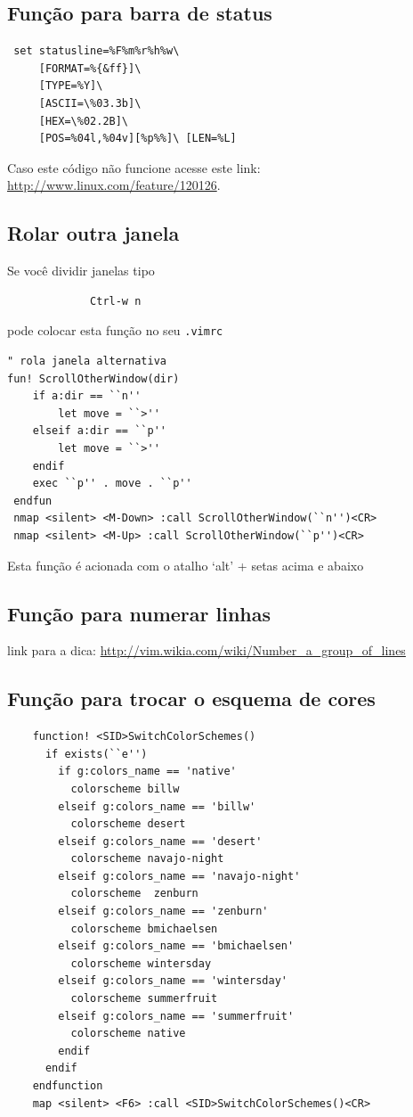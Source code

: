 \documentclass[10pt,a4paper,openany]{book}
\begin{document}
\subsection{Função para barra de status}\label{Função para barra de status}
\begin{verbatim}
 set statusline=%F%m%r%h%w\
	 [FORMAT=%{&ff}]\
	 [TYPE=%Y]\
	 [ASCII=\%03.3b]\
	 [HEX=\%02.2B]\
	 [POS=%04l,%04v][%p%%]\ [LEN=%L]
\end{verbatim}
Caso este código não funcione acesse este link: \url{http://www.linux.com/feature/120126}.


\subsection{Rolar outra janela}\label{Rolar outra janela}

Se você dividir janelas tipo

\begin{verbatim}
			 Ctrl-w n
\end{verbatim}

pode colocar esta função no seu \verb|.vimrc|

\begin{verbatim}
" rola janela alternativa
fun! ScrollOtherWindow(dir)
	if a:dir == ``n''
		let move = ``>''
	elseif a:dir == ``p''
		let move = ``>''
	endif
	exec ``p'' . move . ``p''
 endfun
 nmap <silent> <M-Down> :call ScrollOtherWindow(``n'')<CR>
 nmap <silent> <M-Up> :call ScrollOtherWindow(``p'')<CR>
\end{verbatim}

Esta função é acionada com o atalho `alt' + setas acima e abaixo

\subsection{Função para numerar linhas}\label{Função para numerar linhas}
link para a dica: \url{http://vim.wikia.com/wiki/Number_a_group_of_lines}

\subsection{Função para trocar o esquema de cores}

\begin{verbatim}
	function! <SID>SwitchColorSchemes()
	  if exists(``e'')
		if g:colors_name == 'native'
		  colorscheme billw
		elseif g:colors_name == 'billw'
		  colorscheme desert
		elseif g:colors_name == 'desert'
		  colorscheme navajo-night
		elseif g:colors_name == 'navajo-night'
		  colorscheme  zenburn
		elseif g:colors_name == 'zenburn'
		  colorscheme bmichaelsen
		elseif g:colors_name == 'bmichaelsen'
		  colorscheme wintersday
		elseif g:colors_name == 'wintersday'
		  colorscheme summerfruit
		elseif g:colors_name == 'summerfruit'
		  colorscheme native
		endif
	  endif
	endfunction
	map <silent> <F6> :call <SID>SwitchColorSchemes()<CR>
\end{verbatim}
\end{document}
